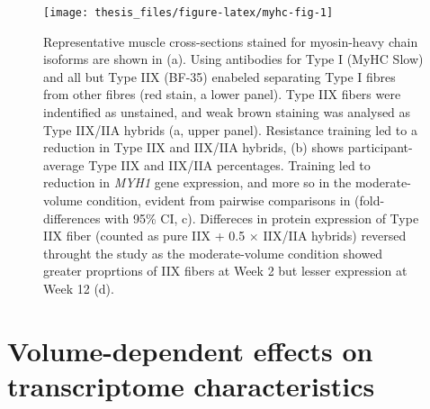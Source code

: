 \documentclass[twoside,10pt]{gihclass} %
\begin{document}
\pagebreak
\begin{figure}

{\centering \texttt{[image: thesis\_files/figure-latex/myhc-fig-1]} 

}

\caption[Fiber-type composition in Study I]{Representative muscle cross-sections stained for myosin-heavy chain isoforms are shown in (a). Using antibodies for Type I (MyHC Slow) and all but Type IIX (BF-35) enabeled separating Type I fibres from other fibres (red stain, a lower panel). Type IIX fibers were indentified as unstained, and weak brown staining was analysed as Type IIX/IIA hybrids (a, upper panel). Resistance training led to a reduction in Type IIX and IIX/IIA hybrids, (b) shows participant-average Type IIX and IIX/IIA percentages. Training led to reduction in \textit{MYH1} gene expression, and more so in the moderate-volume condition, evident from pairwise comparisons in (fold-differences with 95\% CI, c). Differeces in protein expression of Type IIX fiber (counted as pure IIX + 0.5 $\times$ IIX/IIA hybrids) reversed throught the study as the moderate-volume condition showed greater proprtions of IIX fibers at Week 2 but lesser expression at Week 12 (d).}\label{fig:myhc-fig}
\end{figure}
\pagebreak

\hypertarget{volume-dependent-effects-on-transcriptome-characteristics}{%
\section{Volume-dependent effects on transcriptome characteristics}\label{volume-dependent-effects-on-transcriptome-characteristics}}
\end{document}
